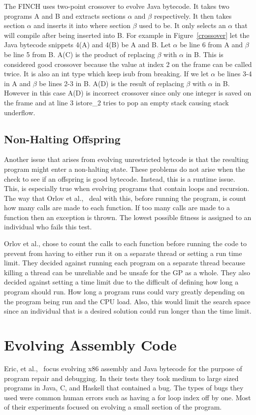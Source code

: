 \documentclass{sig-alternate}
\begin{document}
The FINCH uses two-point crossover to evolve Java bytecode. It takes two programs A and B and extracts sections $\alpha$ and $\beta$ respectively. It then takes section $\alpha$ and inserts it into where section $\beta$ used to be. It only selects an $\alpha$ that will compile after being inserted into B.
For example in Figure~\ref{crossover} let the Java bytecode snippets 4(A) and 4(B) be A and B. Let $\alpha$ be line 6 from A and $\beta$ be line 5 from B. A(C) is the product of replacing $\beta$ with $\alpha$ in B. This is considered good crossover because the value at index 2 on the frame can be called twice. It is also an int type which keep isub from breaking. If we let $\alpha$ be lines 3-4 in A and $\beta$ be lines 2-3 in B. A(D) is the result of replacing $\beta$ with $\alpha$ in B. However in this case A(D) is incorrect crossover since only one integer is saved on the frame and at line 3 istore\_2 tries to pop an empty stack causing stack underflow. 

\subsection{Non-Halting Offspring}
Another issue that arises from evolving unrestricted bytcode is that the resulting program might enter a non-halting state. These problems do not arise when the check to see if an offspring is good bytecode. Instead, this is a runtime issue. This, is especially true when evolving programs that contain loops and recursion.
The way that Orlov et al.,~\cite{FINCH:2011} deal with this, before running the program, is count how many calls are made to each function. If too many calls are made to a function then an exception is thrown. The lowest possible fitness is assigned to an individual who fails this test.

Orlov et al., chose to count the calls to each function before running the code to prevent from having to either run it on a separate thread or setting a run time limit. They decided against running each program on a separate thread because killing a thread can be unreliable and be unsafe for the GP as a whole. They also decided against setting a time limit due to the difficult of defining how long a program should run. How long a program runs could vary greatly depending on the program being run and the CPU load. Also, this would limit the search space since an individual that is a desired solution could run longer than the time limit.


\section{Evolving Assembly Code}
Eric, et al.,~\cite{Assembly:2010} focus evolving x86 assembly and Java bytecode for the purpose of program repair and debugging. In their tests they took medium to large sized programs in Java, C, and Haskell that contained a bug. The types of bugs they used were common human errors such as having a for loop index off by one. Most of their experiments focused on evolving a small section of the program.
\end{document}
